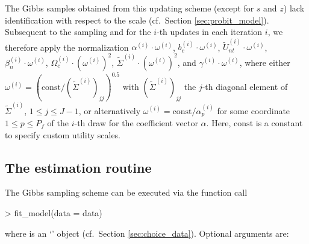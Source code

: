 \documentclass[article,shortnames]{jss}
\newcommand{\class}[1]{`\code{#1}'}
\begin{document}
The Gibbs samples obtained from this updating scheme (except for $s$ and $z$) lack identification with respect to the scale (cf.\ Section \ref{sec:probit_model}). Subsequent to the sampling and for the $i$-th updates in each iteration $i$, we therefore apply the normalization $\alpha^{(i)} \cdot \omega^{(i)}$, $b_c^{(i)} \cdot \omega^{(i)}$, $\tilde{U}_{nt}^{(i)} \cdot \omega^{(i)}$, $\beta_n^{(i)} \cdot \omega^{(i)}$, $\Omega_c^{(i)} \cdot (\omega^{(i)})^2$, $\tilde{\Sigma}^{(i)} \cdot (\omega^{(i)})^2$, and $\gamma^{(i)} \cdot \omega^{(i)}$, where either $\omega^{(i)} = (\text{const} / (\tilde{\Sigma}^{(i)})_{jj})^{0.5}$ with $(\tilde{\Sigma}^{(i)})_{jj}$ the $j$-th diagonal element of $\tilde{\Sigma}^{(i)}$, $1\leq j \leq J-1$, or alternatively $\omega^{(i)} = \text{const} / \alpha^{(i)}_p$ for some coordinate $1\leq p \leq P_f$ of the $i$-th draw for the coefficient vector $\alpha$. Here, $\text{const}$ is a constant to specify custom utility scales.

\subsection{The estimation routine} \label{subsec:estimation_routine}

The Gibbs sampling scheme can be executed via the function call

\begin{Schunk}
\begin{Sinput}
> fit_model(data = data)
\end{Sinput}
\end{Schunk}

where  is an \class{RprobitB\_data} object (cf.\ Section \ref{sec:choice_data}). Optional arguments are:
\end{document}
